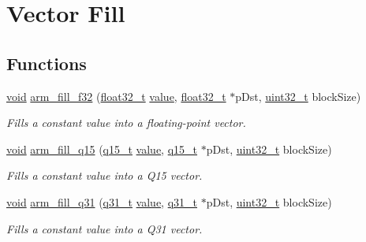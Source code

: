 \hypertarget{group___fill}{\section{Vector Fill}
\label{group___fill}
}
\subsection*{Functions}
\begin{DoxyCompactItemize}
\item 
\hyperlink{group___n_a_m_e_ga18028b8badbf1ea7e704ccac3c488e82}{void} \hyperlink{group___fill_ga2248e8d3901b4afb7827163132baad94}{arm\-\_\-fill\-\_\-f32} (\hyperlink{arm__math_8h_a4611b605e45ab401f02cab15c5e38715}{float32\-\_\-t} \hyperlink{protocol_8h_a4e9aec275e566b978a3ccb4e043d8c61}{value}, \hyperlink{arm__math_8h_a4611b605e45ab401f02cab15c5e38715}{float32\-\_\-t} $\ast$p\-Dst, \hyperlink{stdint_8h_a435d1572bf3f880d55459d9805097f62}{uint32\-\_\-t} block\-Size)
\begin{DoxyCompactList}\small\item\em Fills a constant value into a floating-\/point vector. \end{DoxyCompactList}\item 
\hyperlink{group___n_a_m_e_ga18028b8badbf1ea7e704ccac3c488e82}{void} \hyperlink{group___fill_ga76b21c32a3783a2b3334d930a646e5d8}{arm\-\_\-fill\-\_\-q15} (\hyperlink{arm__math_8h_ab5a8fb21a5b3b983d5f54f31614052ea}{q15\-\_\-t} \hyperlink{protocol_8h_a4e9aec275e566b978a3ccb4e043d8c61}{value}, \hyperlink{arm__math_8h_ab5a8fb21a5b3b983d5f54f31614052ea}{q15\-\_\-t} $\ast$p\-Dst, \hyperlink{stdint_8h_a435d1572bf3f880d55459d9805097f62}{uint32\-\_\-t} block\-Size)
\begin{DoxyCompactList}\small\item\em Fills a constant value into a Q15 vector. \end{DoxyCompactList}\item 
\hyperlink{group___n_a_m_e_ga18028b8badbf1ea7e704ccac3c488e82}{void} \hyperlink{group___fill_ga69cc781cf337bd0a31bb85c772a35f7f}{arm\-\_\-fill\-\_\-q31} (\hyperlink{arm__math_8h_adc89a3547f5324b7b3b95adec3806bc0}{q31\-\_\-t} \hyperlink{protocol_8h_a4e9aec275e566b978a3ccb4e043d8c61}{value}, \hyperlink{arm__math_8h_adc89a3547f5324b7b3b95adec3806bc0}{q31\-\_\-t} $\ast$p\-Dst, \hyperlink{stdint_8h_a435d1572bf3f880d55459d9805097f62}{uint32\-\_\-t} block\-Size)
\begin{DoxyCompactList}\small\item\em Fills a constant value into a Q31 vector. \end{DoxyCompactList}\item 

\end{DoxyCompactItemize}
